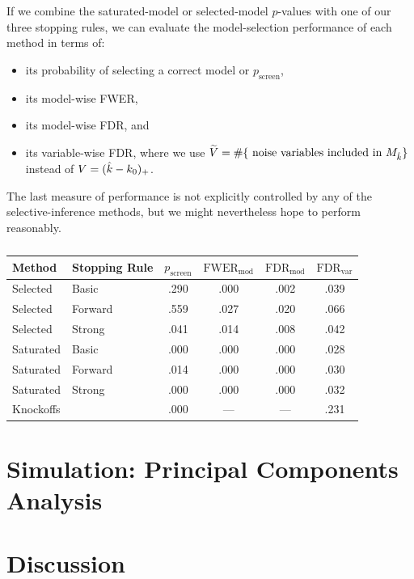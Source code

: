 \documentclass{article}
\begin{document}
If we combine the saturated-model or selected-model $p$-values with one of our three stopping rules, we can evaluate the model-selection performance of each method in terms of:
\begin{itemize}
\item its probability of selecting a correct model or $p_{\text{screen}}$,
\item its model-wise FWER,
\item its model-wise FDR, and
\item its variable-wise FDR, where we use $\widetilde{V}= \#\{\text{ noise variables included in } M_{\hat{k}}\}$ instead of $V=(\hat{k}-k_0)_+$.
\end{itemize} 
The last measure of performance is not explicitly controlled by any of the selective-inference methods, but we might nevertheless hope to perform reasonably. 


\begin{table}[ht]
  \centering
  \begin{tabular}{llcccc}
    \hline
    Method & Stopping Rule & $p_{\text{screen}}$ & $\text{FWER}_{\text{mod}}$ 
    & $\text{FDR}_{\text{mod}}$ 
    & $\text{FDR}_{\text{var}}$ \\ 
    \hline
    Selected & Basic & .290 & .000 & .002 & .039 \\ 
    Selected & Forward & .559 & .027 & .020 & .066 \\ 
    Selected & Strong & .041 & .014 & .008 & .042 \\ 
    \hline
    Saturated & Basic & .000 & .000 & .000 & .028 \\ 
    Saturated & Forward & .014 & .000 & .000 & .030 \\ 
    Saturated & Strong & .000 & .000 & .000 & .032 \\ 
    \hline
    Knockoffs & & .000 & --- & --- & .231 \\ 
    \hline
  \end{tabular}
  \caption{}
\end{table}



\section{Simulation: Principal Components Analysis}\label{sec:pca}



\section{Discussion}




\end{document}
